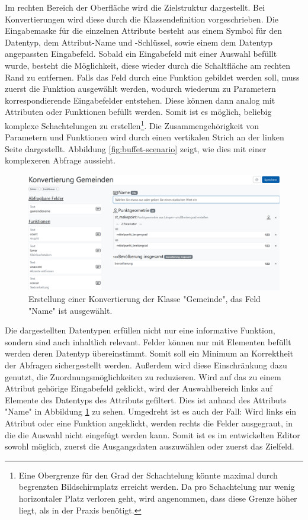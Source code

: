 Im rechten Bereich der Oberfläche wird die Zielstruktur dargestellt. Bei Konvertierungen wird diese durch die Klassendefinition vorgeschrieben. Die Eingabemaske für die einzelnen Attribute besteht aus einem Symbol für den Datentyp, dem Attribut-Name und -Schlüssel, sowie einem dem Datentyp angepassten Eingabefeld. Sobald ein Eingabefeld mit einer Auswahl befüllt wurde, besteht die Möglichkeit, diese wieder durch die Schaltfläche am rechten Rand zu entfernen. Falls das Feld durch eine Funktion gebildet werden soll, muss zuerst die Funktion ausgewählt werden, wodurch wiederum zu Parametern korrespondierende Eingabefelder entstehen. Diese können dann analog mit Attributen oder Funktionen befüllt werden. Somit ist es möglich, beliebig komplexe Schachtelungen zu erstellen\footnote{Eine Obergrenze für den Grad der Schachtelung könnte maximal durch begrenzten Bildschirmplatz erreicht werden. Da pro Schachtelung nur wenig horizontaler Platz verloren geht, wird angenommen, dass diese Grenze höher liegt, als in der Praxis benötigt.}. Die Zusammengehörigkeit von Parametern und Funktionen wird durch einen vertikalen Strich an der linken Seite dargestellt. Abbildung \ref{fig:buffet-scenario} zeigt, wie dies mit einer komplexeren Abfrage aussieht.

\begin{figure}[ht]
  \begin{center}
    \includegraphics[width=.95\textwidth]{assets/buffet-selected.png}
  \end{center}
  \caption{Erstellung einer Konvertierung der Klasse "Gemeinde", das Feld "Name" ist ausgewählt.}
  \label{fig:buffet-selected}
\end{figure}

Die dargestellten Datentypen erfüllen nicht nur eine informative Funktion, sondern sind auch inhaltlich relevant. Felder können nur mit Elementen befüllt werden deren Datentyp übereinstimmt. Somit soll ein Minimum an Korrektheit der Abfragen sichergestellt werden. Außerdem wird diese Einschränkung dazu genutzt, die Zuordnungsmöglichkeiten zu reduzieren. Wird auf das zu einem Attribut gehörige Eingabefeld geklickt, wird der Auswahlbereich links auf Elemente des Datentyps des Attributs gefiltert. Dies ist anhand des Attributs "Name" in Abbildung \ref{fig:buffet-selected} zu sehen. Umgedreht ist es auch der Fall: Wird links ein Attribut oder eine Funktion angeklickt, werden rechts die Felder ausgegraut, in die die Auswahl nicht eingefügt werden kann. Somit ist es im entwickelten Editor sowohl möglich, zuerst die Ausgangsdaten auszuwählen oder zuerst das Zielfeld.

